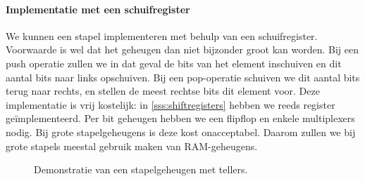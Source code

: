 \paragraph{Implementatie met een schuifregister}
We kunnen een stapel implementeren met behulp van een schuifregister. Voorwaarde is wel dat het geheugen dan niet bijzonder groot kan worden. Bij een push operatie zullen we in dat geval de bits van het element inschuiven en dit aantal bits naar links opschuiven. Bij een pop-operatie schuiven we dit aantal bits terug naar rechts, en stellen de meest rechtse bits dit element voor. Deze implementatie is vrij kostelijk: in \ref{sss:shiftregisters} hebben we reeds register ge\"implementeerd. Per bit geheugen hebben we een flipflop en enkele multiplexers nodig. Bij grote stapelgeheugens is deze kost onacceptabel. Daarom zullen we bij grote stapels meestal gebruik maken van RAM-geheugens.
\begin{figure}[hbt]
\centering
{}
\caption{Demonstratie van een stapelgeheugen met tellers.}
\label{fig:stackConceptExample}
\end{figure}
